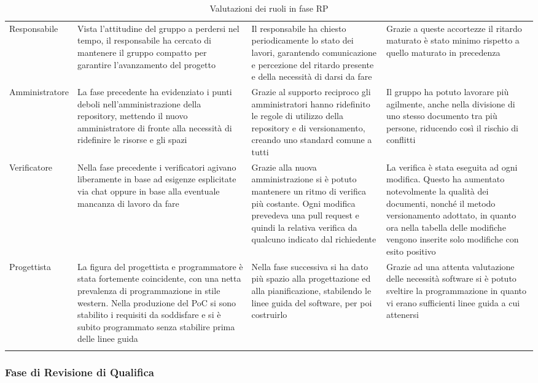\documentclass[../piano_di_qualifica.tex]{subfiles}
\begin{document}
\begin{center}
\begin{longtable}{|p{2.5cm}|p{4.5cm}|p{4.5cm}|p{4.5cm}|}
		Responsabile & Vista l’attitudine del gruppo a perdersi nel tempo, il responsabile ha cercato di mantenere il gruppo compatto per garantire l’avanzamento del progetto & Il responsabile ha chiesto periodicamente lo stato dei lavori, garantendo comunicazione e percezione del ritardo presente e della necessità di darsi da fare & Grazie a queste accortezze il ritardo maturato è stato minimo rispetto a quello maturato in precedenza \\
		Amministratore & La fase precedente ha evidenziato i punti deboli nell’amministrazione della repository, mettendo il nuovo amministratore di fronte alla necessità di ridefinire le risorse e gli spazi & Grazie al supporto reciproco gli amministratori hanno ridefinito le regole di utilizzo della repository e di versionamento, creando uno standard comune a tutti & Il gruppo ha potuto lavorare più agilmente, anche nella divisione di uno stesso documento tra più persone, riducendo così il rischio di conflitti  \\
		Verificatore & Nella fase precedente i verificatori agivano liberamente in base ad esigenze esplicitate via chat oppure in base alla eventuale mancanza di lavoro da fare & Grazie alla nuova amministrazione si è potuto mantenere un ritmo di verifica più costante. Ogni modifica prevedeva una pull request e quindi la relativa verifica da qualcuno indicato dal richiedente & La verifica è stata eseguita ad ogni modifica. Questo ha aumentato notevolmente la qualità dei documenti, nonché il metodo versionamento adottato, in quanto ora nella tabella delle modifiche vengono inserite solo modifiche con esito positivo \\
		Progettista & La figura del progettista e programmatore è stata fortemente coincidente, con una netta prevalenza di programmazione in stile western. Nella produzione del PoC si sono stabilito i requisiti da soddisfare e si è subito programmato senza stabilire prima delle linee guida & Nella fase successiva si ha dato più spazio alla progettazione ed alla pianificazione, stabilendo le linee guida del software, per poi costruirlo & Grazie ad una attenta valutazione delle necessità software si è potuto sveltire la programmazione in quanto vi erano sufficienti linee guida a cui attenersi \\

		\hline
		\rowcolor{white}
		\caption{Valutazioni dei ruoli in fase RP}
	\end{longtable}
\end{center}

\subsubsection{Fase di Revisione di Qualifica}
\end{document}
